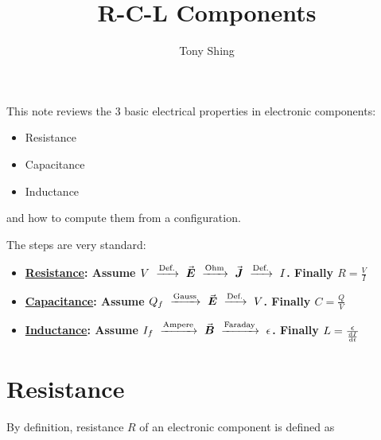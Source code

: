 \documentclass[class=article, crop=false, 12pt]{standalone}
\author{Tony Shing}
\title{R-C-L Components}
\begin{document}
\maketitle


\begin{overview}
    
    This note reviews the 3 basic electrical properties in electronic components: 
    \begin{itemize}
        \item Resistance
        \item Capacitance
        \item Inductance
    \end{itemize}
    and how to compute them from a configuration.
    
    The steps are very standard:
    \begin{itemize}
        \item \bf{\ul{Resistance}}: 
        Assume $V \ \xrightarrow{\text{Def.}}\ \vvec{E} \ \xrightarrow{\text{Ohm}}\ \vvec{J} \ \xrightarrow{\text{Def.}}\ I$. 
        Finally $R=\frac{V}{I}$
        \item \bf{\ul{Capacitance}}: 
        Assume $Q_f \ \xrightarrow{\text{Gauss}}\ \vvec{E} \ \xrightarrow{\text{Def.}}\ V$.
        Finally $C=\frac{Q}{V}$
        \item \bf{\ul{Inductance}}: 
        Assume $I_f \ \xrightarrow{\text{Ampere}}\ \vvec{B} \ \xrightarrow{\text{Faraday}}\ \epsilon$.
        Finally $L=\frac{\epsilon}{\dv{I}{t}}$
    \end{itemize}
\end{overview}





\section{Resistance}

By definition, resistance $R$ of an electronic component is defined as

\end{document}
